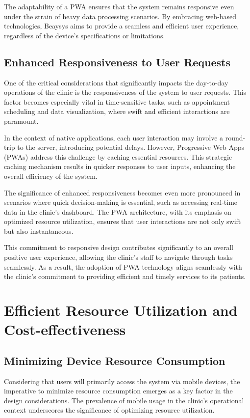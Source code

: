 \documentclass[conference]{IEEEtran}
\begin{document}
The adaptability of a PWA ensures that the system remains responsive even under the strain of heavy data processing scenarios. By embracing web-based technologies, Beaysys aims to provide a seamless and efficient user experience, regardless of the device's specifications or limitations.

\subsection{Enhanced Responsiveness to User Requests}
One of the critical considerations that significantly impacts the day-to-day operations of the clinic is the responsiveness of the system to user requests. This factor becomes especially vital in time-sensitive tasks, such as appointment scheduling and data visualization, where swift and efficient interactions are paramount.

In the context of native applications, each user interaction may involve a round-trip to the server, introducing potential delays. However, Progressive Web Apps (PWAs) address this challenge by caching essential resources. This strategic caching mechanism results in quicker responses to user inputs, enhancing the overall efficiency of the system.

The significance of enhanced responsiveness becomes even more pronounced in scenarios where quick decision-making is essential, such as accessing real-time data in the clinic’s dashboard. The PWA architecture, with its emphasis on optimized resource utilization, ensures that user interactions are not only swift but also instantaneous.

This commitment to responsive design contributes significantly to an overall positive user experience, allowing the clinic's staff to navigate through tasks seamlessly. As a result, the adoption of PWA technology aligns seamlessly with the clinic's commitment to providing efficient and timely services to its patients.

\section{Efficient Resource Utilization and Cost-effectiveness}

\subsection{Minimizing Device Resource Consumption}
Considering that users will primarily access the system via mobile devices, the imperative to minimize resource consumption emerges as a key factor in the design considerations. The prevalence of mobile usage in the clinic's operational context underscores the significance of optimizing resource utilization.
\end{document}
